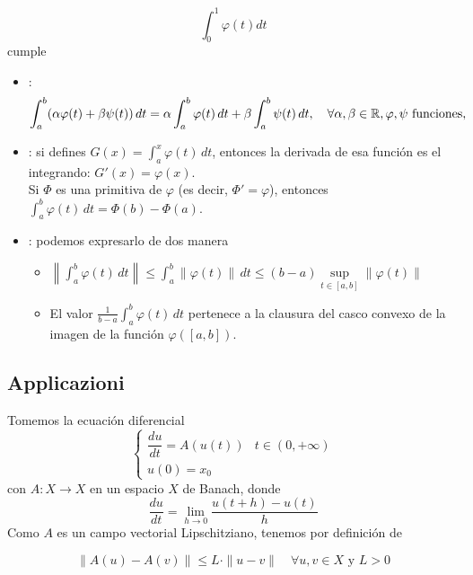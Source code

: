 $$\int_{0}^{1} \varphi(t) dt$$
cumple
\begin{itemize}
    \item {}:
    \begin{equation*}
        \int_{a}^{b} (\alpha \varphi(t) + \beta \psi(t)) \, dt = \alpha \int_{a}^{b} \varphi(t) \, dt + \beta \int_{a}^{b} \psi(t) \, dt, \quad \forall  \alpha,\beta\in \mathbb{R}, \varphi, \psi \text{ funciones},
    \end{equation*}
    \item {}: si defines $G(x) = \int_{a}^{x} \varphi(t) \, dt$, entonces la derivada de esa función es el integrando: $G'(x) = \varphi(x)$. \\
    Si $\Phi$ es una primitiva de $\varphi$ (es decir, $\Phi' = \varphi$), entonces $\int_{a}^{b} \varphi(t) \, dt = \Phi(b) - \Phi(a)$.
    \item {}: podemos expresarlo de dos manera
    \begin{itemize}
        \item $\left\| \int_{a}^{b} \varphi(t) \, dt \right\| \leq \int_{a}^{b} \|\varphi(t)\| \, dt \leq (b-a) \sup\limits_{t \in [a,b]} \|\varphi(t)\|$
        \item El valor $\frac{1}{b-a} \int_{a}^{b} \varphi(t) \, dt$ pertenece a la clausura del casco convexo de la imagen de la función $\varphi([a,b])$.
    \end{itemize}
\end{itemize}

\subsection{Applicazioni}

\noindent Tomemos la ecuación diferencial 
\begin{equation*}
    \begin{cases} 
        \dfrac{du}{dt} = A(u(t)) & t \in (0, +\infty) \\ 
        u(0) = x_0 
    \end{cases}
\end{equation*}
con $A: X \to X$ en un espacio $X$ de Banach, donde 
$$\frac{du}{dt} = \lim_{h \to 0} \frac{u(t+h) - u(t)}{h}$$
Como  $A$ es un campo vectorial Lipschitziano, tenemos por definición de 

$$\|A(u) - A(v)\| \leq L \cdot \|u - v\| \quad \forall u, v \in X \text{ y } L > 0$$

